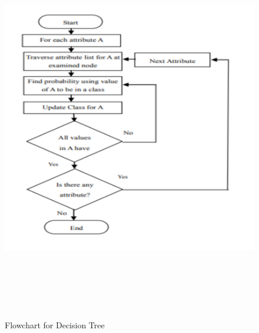 \documentclass[oneside,12pt]{Classes/VTU}
\begin{document}
    		\begin{figure}
    		\begin{center}
    			\includegraphics[height=17cm]{images/decision_tree.png}
    			\caption{Flowchart for Decision Tree}
    		\end{center}
    	\end{figure}
    
    	
\end{document}
